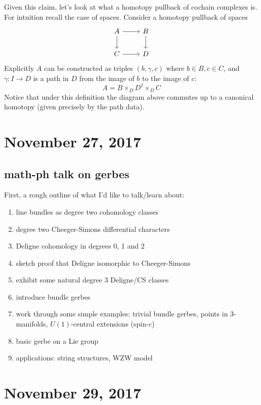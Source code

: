 \documentclass{amsart}
\begin{document}
Given this claim, let's look at what a homotopy pullback of cochain complexes is.
For intuition recall the case of spaces. Consider a homotopy pullback of spaces
\begin{equation*}
    \begin{tikzcd}
        A \rar\dar & B\dar\\
        C \rar & D
    \end{tikzcd}
\end{equation*}
Explicitly $A$ can be constructed as triples $(b,\gamma, c)$ where $b\in B, c\in C$,
and $\gamma:I\to D$ is a path in $D$ from the image of $b$ to the image of $c$:
\begin{equation*}
    A=B\times_D D^I \times_D C
\end{equation*}
Notice that under this definition the diagram above commutes up to a canonical
homotopy (given precisely by the path data).

\section{November 27, 2017}

\subsection{math-ph talk on gerbes}

First, a rough outline of what I'd like to talk/learn about:
\begin{enumerate}
    \item line bundles as degree two cohomology classes
    \item degree two Cheeger-Simons differential characters
    \item Deligne cohomology in degrees 0, 1 and 2
    \item sketch proof that Deligne isomorphic to Cheeger-Simons
    \item exhibit some natural degree 3 Deligne/CS classes
    \item introduce bundle gerbes
    \item work through some simple examples: trivial bundle gerbes, points in 3-manifolds, $U(1)$-central extensions (spin-c)
    \item basic gerbe on a Lie group
    \item applications: string structures, WZW model
\end{enumerate}

\section{November 29, 2017}
\end{document}
